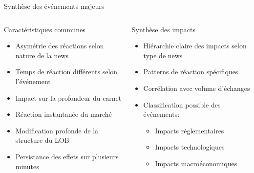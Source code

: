 \documentclass[aspectratio=169]{beamer}  %
\begin{document}
\begin{frame}{Synthèse des événements majeurs}
    \begin{columns}
        \begin{column}{0.48\textwidth}
            \begin{alertblock}{Caractéristiques communes}
                \begin{itemize}
                    \item Asymétrie des réactions selon nature de la news
                    \item Temps de réaction différents selon l'événement
                    \item Impact sur la profondeur du carnet
                    \item Réaction instantanée du marché
                    \item Modification profonde de la structure du LOB
                    \item Persistance des effets sur plusieurs minutes
                \end{itemize}
            \end{alertblock}
        \end{column}
        \begin{column}{0.48\textwidth}
            \begin{alertblock}{Synthèse des impacts}
                \begin{itemize}
                    \item Hiérarchie claire des impacts selon type de news
                    \item Patterns de réaction spécifiques
                    \item Corrélation avec volume d'échanges
                    \item Classification possible des événements:
                    \begin{itemize}
                        \item Impacts réglementaires
                        \item Impacts technologiques
                        \item Impacts macroéconomiques
                    \end{itemize}
                \end{itemize}
            \end{alertblock}
        \end{column}
    \end{columns}
\end{frame}
\end{document}
